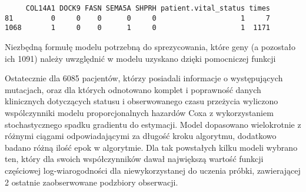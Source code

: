 \begin{verbatim}
     COL14A1 DOCK9 FASN SEMA5A SHPRH patient.vital_status times
81         0     0    0      0     0                    1     7
1068       1     0    0      1     0                    1  1171
\end{verbatim}

Niezbędną formułę modelu potrzebną do sprezycowania, które geny (a
pozostało ich 1091) należy uwzględnić w modelu uzyskano dzięki
pomocniczej funkcji

\begin{Shaded}
\begin{Highlighting}[]
\StringTok{ }
\end{Highlighting}
\end{Shaded}

Ostatecznie dla 6085 pacjentów, którzy posiadali informacje o
występujących mutacjach, oraz dla których odnotowano komplet i
poprawność danych klinicznych dotyczących statusu i obserwowanego czasu
przeżycia wyliczono wspólczynniki modelu proporcjonalnych hazardów Coxa
z wykorzystaniem stochastycznego spadku gradientu do estymacji. Model
dopasowano wielokrotnie z różnymi ciągami odpowiadającymi za długość
kroku algorytmu, dodatkowo badano różną ilość epok w algorytmie. Dla tak
powstałych kilku modeli wybrano ten, który dla swoich współczynników
dawał największą wartość funkcji częściowej log-wiarogodności dla
niewykorzystanej do uczenia próbki, zawierającej 2 ostatnie
zaobserwowane podzbiory obserwacji.

